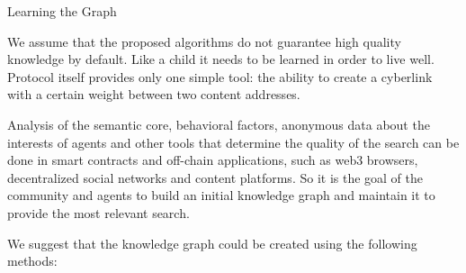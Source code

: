 \documentclass[10pt,oneside]{amsart}
\makeatletter
\def\section{\@startsection{section}{1}%
  \z@{.7\linespacing\@plus\linespacing}{.5\linespacing}%
  {\normalfont\scshape}}%
\makeatother
\begin{document}
\section{Learning the Graph}\label{Learning the Graph}

We assume that the proposed algorithms do not guarantee high quality knowledge by default. Like a child it needs to be learned in order to live well. Protocol itself provides only one simple tool: the ability to create a cyberlink with a certain weight between two content addresses.

Analysis of the semantic core, behavioral factors, anonymous data about the interests of agents and other tools that determine the quality of the search can be done in smart contracts and off-chain applications, such as web3 browsers, decentralized social networks and content platforms. So it is the goal of the community and agents to build an initial knowledge graph and maintain it to provide the most relevant search.

We suggest that the knowledge graph could be created using the following methods:
\end{document}

